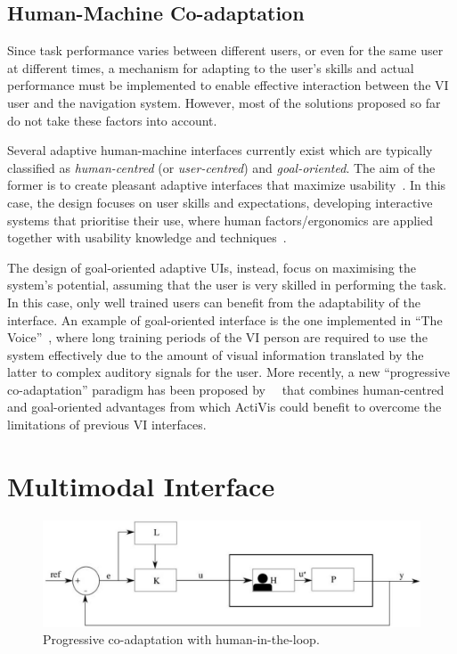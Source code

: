 \documentclass[format=sigconf, review=true, screen=true, anonymous=true]{acmart}
\begin{document}
\subsection{Human-Machine Co-adaptation}\label{sec:co-adaptation}

Since task performance varies between different users, or even for the same user at different times, a mechanism for adapting to the user's skills and actual performance must be implemented to enable effective interaction between the VI user and the navigation system. However, most of the solutions proposed so far do not take these factors into account.

Several adaptive human-machine interfaces currently exist which are typically classified as \emph{human-centred} (or \emph{user-centred}) and \emph{goal-oriented}. The aim of the former is to create pleasant adaptive interfaces that maximize usability~\cite{Dixon2012}. In this case, the design focuses on user skills and expectations, developing interactive systems that prioritise their use, where human factors/ergonomics are applied together with usability knowledge and techniques~\cite{Jokela2003}.

The design of goal-oriented adaptive UIs, instead, focus on maximising the system's potential, assuming that the user is very skilled in performing the task. In this case, only well trained users can benefit from the adaptability of the interface. An example of goal-oriented interface is the one implemented in ``The Voice''~\cite{meijer2010}, where long training periods of the VI person are required to use the system effectively due to the amount of visual information translated by the latter to complex auditory signals for the user. More recently, a new ``progressive co-adaptation'' paradigm has been proposed by~\citeauthor{gallina2015}~\cite{gallina2015} that combines human-centred and goal-oriented advantages from which ActiVis could benefit to overcome the limitations of previous VI interfaces.

\section{Multimodal Interface}\label{sec:multimodal}

\begin{figure}
  \centering
  \includegraphics[width=0.8\columnwidth]{figures/loop.jpg}
  \caption{Progressive co-adaptation with human-in-the-loop.\label{fig:loop}}
\end{figure}
\end{document}
